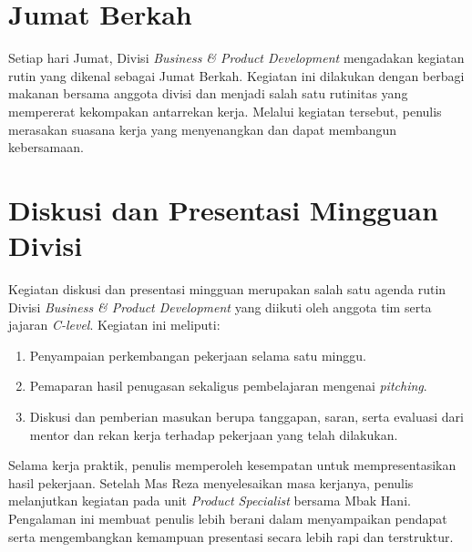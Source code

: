 \section{Jumat Berkah}
Setiap hari Jumat, Divisi \textit{Business \& Product Development} mengadakan kegiatan rutin yang dikenal sebagai Jumat Berkah. Kegiatan ini dilakukan dengan berbagi makanan bersama anggota divisi dan menjadi salah satu rutinitas yang mempererat kekompakan antarrekan kerja. Melalui kegiatan tersebut, penulis merasakan suasana kerja yang menyenangkan dan dapat membangun kebersamaan.

\section{Diskusi dan Presentasi Mingguan Divisi}
Kegiatan diskusi dan presentasi mingguan merupakan salah satu agenda rutin Divisi \textit{Business \& Product Development} yang diikuti oleh anggota tim serta jajaran \textit{C-level}. Kegiatan ini meliputi:

\begin{enumerate}
    \item Penyampaian perkembangan pekerjaan selama satu minggu.
    \item Pemaparan hasil penugasan sekaligus pembelajaran mengenai \textit{pitching}.
    \item Diskusi dan pemberian masukan berupa tanggapan, saran, serta evaluasi dari mentor dan rekan kerja terhadap pekerjaan yang telah dilakukan.
\end{enumerate}

Selama kerja praktik, penulis memperoleh kesempatan untuk mempresentasikan hasil pekerjaan. Setelah Mas Reza menyelesaikan masa kerjanya, penulis melanjutkan kegiatan pada unit \textit{Product Specialist} bersama Mbak Hani. Pengalaman ini membuat penulis lebih berani dalam menyampaikan pendapat serta mengembangkan kemampuan presentasi secara lebih rapi dan terstruktur.
